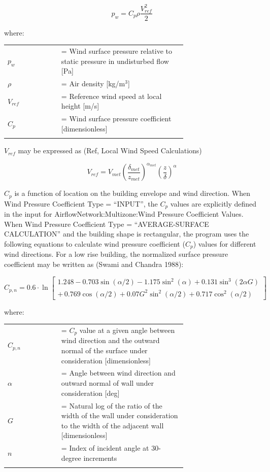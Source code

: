 \begin{equation}
p_w = C_p \rho \frac{V_{ref}^2}{2}
\end{equation}

where:

\begin{tabular}{lp{0.7\linewidth}}
\\
$p_w$ &= Wind surface pressure relative to static pressure in undisturbed flow [Pa]\\
$\rho$ &= Air density [kg/m\(^{3}\)]\\
$V_{ref}$ &= Reference wind speed at local height [m/s]\\
$C_p$ &= Wind surface pressure coefficient [dimensionless]\\
\\
\end{tabular}

$V_{ref}$ may be expressed as (Ref, Local Wind Speed Calculations)

\begin{equation}
V_{ref} = V_{met} \left( \frac{\delta_{met}}{z_{met}} \right)^{\alpha_{met}}\left( \frac{z}{\delta} \right)^\alpha
\end{equation}

$C_p$ is a function of location on the building envelope and wind direction. When Wind Pressure Coefficient Type = ``INPUT'', the $C_p$ values are explicitly defined in the input for AirflowNetwork:Multizone:Wind Pressure Coefficient Values. When Wind Pressure Coefficient Type = ``AVERAGE-SURFACE CALCULATION'' and the building shape is rectangular, the program uses the following equations to calculate wind pressure coefficient ($C_p$) values for different wind directions. For a low rise building, the normalized surface pressure coefficient may be written as (Swami and Chandra 1988):

\begin{equation}
C_{p,n} = 0.6 \cdot \ln \left[ \begin{array}{l}1.248 - 0.703\sin (\alpha /2) - 1.175{\sin ^2}(\alpha ) + 0.131{\sin ^3}(2\alpha G)\\ + \,0.769\cos (\alpha /2) + 0.07{G^2}{\sin ^2}(\alpha /2) + 0.717{\cos ^2}(\alpha /2)\end{array} \right]
\end{equation}

where:

\begin{tabular}{lp{0.7\linewidth}}
\\
$C_{p,n}$ &= $C_p$ value at a given angle between wind direction and the outward normal of the surface under consideration [dimensionless]\\
$\alpha$ &= Angle between wind direction and outward normal of wall under consideration [deg]\\
$G$ &= Natural log of the ratio of the width of the wall under consideration to the width of the adjacent wall [dimensionless]\\
$n$ &= Index of incident angle at 30-degree increments\\
\\
\end{tabular}

